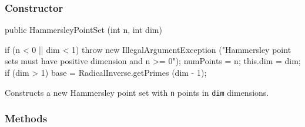 \subsubsection*{Constructor}

\begin{code}

   public HammersleyPointSet (int n, int dim) \begin{hide} {
      if (n < 0 || dim < 1)
         throw new IllegalArgumentException
            ("Hammersley point sets must have positive dimension and n >= 0");
      numPoints = n;
      this.dim  = dim;
      if (dim > 1)
         base = RadicalInverse.getPrimes (dim - 1);
   }\end{hide}
\end{code}
 \begin{tabb}
   Constructs a new Hammersley point set with \texttt{n} points in \texttt{dim}
   dimensions.
 \end{tabb}
\begin{htmlonly}
\end{htmlonly}

\subsubsection*{Methods}

